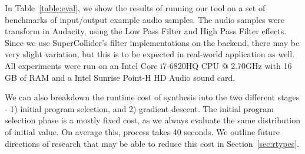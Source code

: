 In Table~\ref{table:eval}, we show the results of running our tool on a set of benchmarks of input/output example audio samples.
The audio samples were transform in Audacity, using the Low Pass Filter and High Pass Filter effects.
Since we use SuperCollider's filter implementations on the backend, there may be very slight variation, but this is to be expected in real-world application as well.
All experiments were run on an Intel Core i7-6820HQ CPU @ 2.70GHz with 16 GB of RAM and a Intel Sunrise Point-H HD Audio sound card.


We can also breakdown the runtime cost of synthesis into the two different stages - 1) initial program selection, and 2) gradient descent.
The initial program selection phase is a mostly fixed cost, as we always evaluate the same distribution of initial value.
On average this, process takes 40 seconds.
We outline future directions of research that may be able to reduce this cost in Section~\ref{sec:rtypes}.
